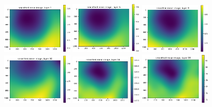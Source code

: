 \documentclass[letterpaper,11pt]{article}
\begin{document}
\begin{figure}[!ht]
\centering
\includegraphics[width=0.32\textwidth]{images/results/smoothed_mean_image_layers/smoothed_mean_image_layer_1}
\includegraphics[width=0.32\textwidth]{images/results/smoothed_mean_image_layers/smoothed_mean_image_layer_5}
\includegraphics[width=0.32\textwidth]{images/results/smoothed_mean_image_layers/smoothed_mean_image_layer_9}
\includegraphics[width=0.32\textwidth]{images/results/smoothed_mean_image_layers/smoothed_mean_image_layer_10}
\includegraphics[width=0.32\textwidth]{images/results/smoothed_mean_image_layers/smoothed_mean_image_layer_14}
\includegraphics[width=0.32\textwidth]{images/results/smoothed_mean_image_layers/smoothed_mean_image_layer_18}

\end{figure}
\end{document}
